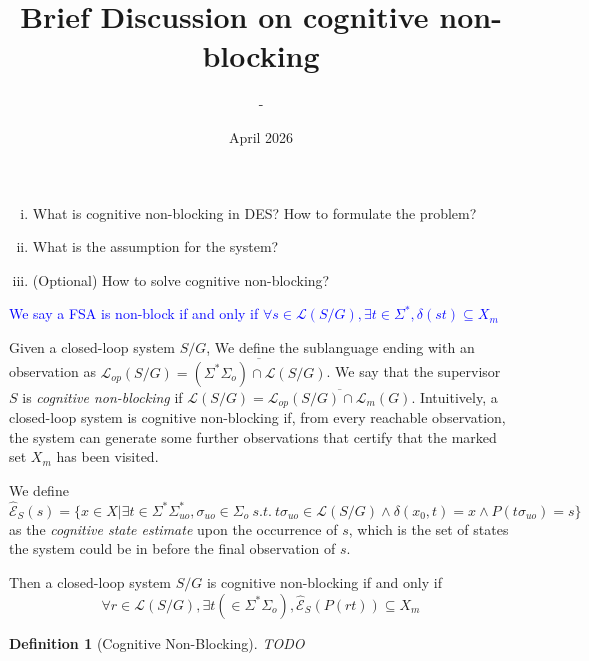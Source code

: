 \documentclass{article}
\title{Brief Discussion on cognitive non-blocking}
\author{-}
\date{April 2026}
\newcommand{\highlight}[1]{\textcolor{blue}{#1}}
\newtheorem{definition}{Definition}
\def\highlight#1{\textcolor{blue}{#1}}
\begin{document}
\maketitle

\begin{enumerate}[(i)]
    \item What is cognitive non-blocking in DES? How to formulate the problem?
    \item What is the assumption for the system?
    \item (Optional) How to solve cognitive non-blocking?
\end{enumerate}

\highlight{
We say a FSA is non-block if and only if
$\forall s \in \mathcal{L}(S/G), \exists t \in \Sigma^*, \delta(st) \subseteq X_m$}

Given a closed-loop system $S/G$, We define the sublanguage ending with an observation as
$\mathcal{L}_{op}(S/G) = \overline{(\Sigma^* \Sigma_o) \cap \mathcal{L}(S/G)}$.
We say that the supervisor $S$ is \textit{cognitive non-blocking} if
$\mathcal{L}(S / G) = \overline{\mathcal{L}_{op}(S/G) \cap \mathcal{L}_m(G)}$.
Intuitively, a closed-loop system is cognitive non-blocking if, from every reachable observation, the system can generate some further observations that certify that the marked set $X_m$ has been visited.

We define
$$
\hat{\mathcal{E}}_S(s) = \{ x \in X | \exists t \in \Sigma^*\Sigma_{uo}^*, \sigma_{uo} \in \Sigma_o \ s.t. \ t \sigma_{uo} \in \mathcal{L}(S / G) \wedge \delta(x_0, t) = x \wedge P(t \sigma_{uo}) =  s \}
$$
as the \textit{cognitive state estimate} upon the occurrence of $s$, which is the set of states the system could be in before the final observation of $s$.

Then a closed-loop system $S / G$ is cognitive non-blocking if and only if
$$
\forall r \in \mathcal{L}(S / G), \exists t (\in \Sigma^*\Sigma_o), \hat{\mathcal{E}}_S(P(rt)) \subseteq X_m
$$

\begin{definition}[Cognitive Non-Blocking]
    TODO
\end{definition}
\end{document}
